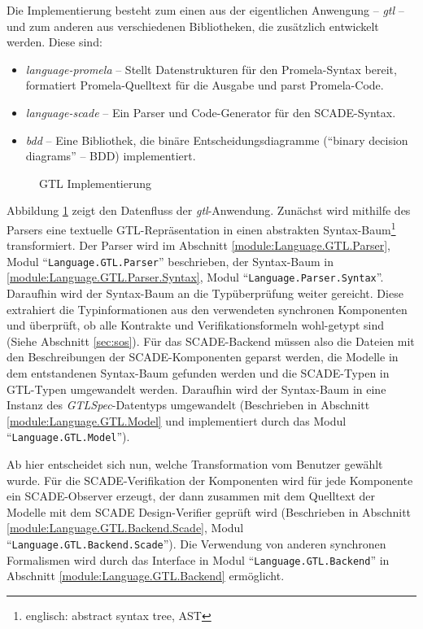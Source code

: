 Die Implementierung besteht zum einen aus der eigentlichen Anwengung -- \emph{gtl} -- und zum anderen aus verschiedenen Bibliotheken, die zusätzlich entwickelt werden.
Diese sind:
\begin{itemize}
\item \emph{language-promela} -- Stellt Datenstrukturen für den Promela-Syntax bereit, formatiert Promela-Quelltext für die Ausgabe und parst Promela-Code.
\item \emph{language-scade} -- Ein Parser und Code-Generator für den SCADE-Syntax.
\item \emph{bdd} -- Eine Bibliothek, die binäre Entscheidungsdiagramme ("`binary decision diagrams"' -- BDD) implementiert.
\end{itemize}

\begin{figure}[h]
  \centering
  
  \caption{GTL Implementierung}
  \label{fig:gtl_implementation}
\end{figure}

Abbildung \ref{fig:gtl_implementation} zeigt den Datenfluss der \emph{gtl}-Anwendung.
Zunächst wird mithilfe des Parsers eine textuelle GTL-Repräsentation in einen abstrakten Syntax-Baum\footnote{englisch: abstract syntax tree, AST} transformiert.
Der Parser wird im Abschnitt \ref{module:Language.GTL.Parser}, Modul "`\verb|Language.GTL.Parser|"' beschrieben, der Syntax-Baum in \ref{module:Language.GTL.Parser.Syntax}, Modul "`\verb|Language.Parser.Syntax|"'.
Daraufhin wird der Syntax-Baum an die Typüberprüfung weiter gereicht.
Diese extrahiert die Typinformationen aus den verwendeten synchronen Komponenten und überprüft, ob alle Kontrakte und Verifikationsformeln wohl-getypt sind (Siehe Abschnitt \ref{sec:sos}).
Für das SCADE-Backend müssen also die Dateien mit den Beschreibungen der SCADE-Komponenten geparst werden, die Modelle in dem entstandenen Syntax-Baum gefunden werden und die SCADE-Typen in GTL-Typen umgewandelt werden.
Daraufhin wird der Syntax-Baum in eine Instanz des \emph{GTLSpec}-Datentyps umgewandelt (Beschrieben in Abschnitt \ref{module:Language.GTL.Model} und implementiert durch das Modul "`\verb|Language.GTL.Model|"').

Ab hier entscheidet sich nun, welche Transformation vom Benutzer gewählt wurde.
Für die SCADE-Verifikation der Komponenten wird für jede Komponente ein SCADE-Observer erzeugt, der dann zusammen mit dem Quelltext der Modelle mit dem SCADE Design-Verifier geprüft wird (Beschrieben in Abschnitt \ref{module:Language.GTL.Backend.Scade}, Modul "`\verb|Language.GTL.Backend.Scade|"').
Die Verwendung von anderen synchronen Formalismen wird durch das Interface in Modul "`\verb|Language.GTL.Backend|"' in Abschnitt \ref{module:Language.GTL.Backend} ermöglicht.

